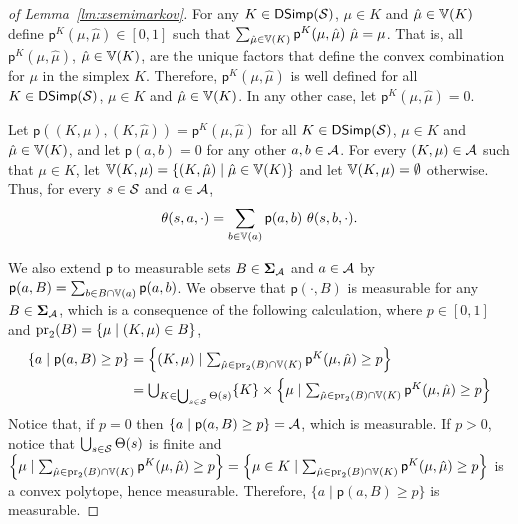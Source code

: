 \begin{proof}[of Lemma~\ref{lm:xsemimarkov}]
  \newcommand{\convp}{\mathsf{p}}%
  For any $K\in\mathsf{DSimp}(\mathcal{S})$, $\mu\in K$ and
  $\hat{\mu}\in\mathbb{V}(K)$ define $\convp^K(\mu,\hat{\mu})\in[0,1]$
  such that
  $\sum_{\hat{\mu}\in\vertices(K)}\convp^K(\mu,\hat{\mu})\mult\hat{\mu}=\mu$.
  That is, all $\convp^K(\mu,\hat{\mu})$, $\hat{\mu}\in\mathbb{V}(K)$,
  are the unique factors that define the convex combination for $\mu$
  in the simplex $K$.  Therefore, $\convp^K(\mu,\hat{\mu})$ is well
  defined for all $K\in\mathsf{DSimp}(\mathcal{S})$, $\mu\in K$ and
  $\hat{\mu}\in\mathbb{V}(K)$.  In any other case, let
  $\convp^K(\mu,\hat{\mu})=0$.

  Let $\convp((K,\mu),(K,\hat{\mu}))=\convp^K(\mu,\hat{\mu})$ for all
  $K\in\mathsf{DSimp}(\mathcal{S})$, $\mu\in K$ and $\hat{\mu}\in\mathbb{V}(K)$,
  and let $\convp(a,b)=0$ for any other $a,b\in\mathcal{A}$.
  For every $(K,\mu)\in\mathcal{A}$ such that $\mu\in K$, let
  $\mathbb{V}(K,\mu)=\{(K,\hat{\mu})\mid\hat{\mu}\in\mathbb{V}(K)\}$ and
  let $\mathbb{V}(K,\mu)=\emptyset$ otherwise.
  Thus, for every $s\in\mathcal{S}$ and $a\in\mathcal{A}$,
  \begin{equation}\label{eq:xsemimarkov:sgtrans:convp}
    \sgtrans(s,a,\cdot) =
    \sum_{b\in\vertices(a)}\convp(a,b)\mult\sgtrans(s,b,\cdot).
  \end{equation}

  We also extend $\convp$ to measurable sets $B\in\bm{\Sigma}_{\mathcal{A}}$
  and $a\in\mathcal{A}$ by
  $\convp(a,B)=\sum_{b\in B\cap\vertices(a)}\convp(a,b)$.
  We observe that $\convp(\cdot,B)$ is measurable for any
  $B\in\bm{\Sigma}_{\mathcal{A}}$, which is a consequence of the following
  calculation, where $p\in[0,1]$ and $\mathrm{pr}_2(B)=\{\mu\mid(K,\mu)\in B\}$,
  \begin{align*}
    \{a\mid\convp(a,B)\geq p\}
    & = \textstyle
    \left\{(K,\mu)\mid\sum_{\hat{\mu}\in\proj_2(B)\cap\vertices(K)}\convp^K(\mu,\hat{\mu})\geq p \right\} \\ 
    & = \textstyle
    \bigcup_{K\in\bigcup_{s\in\psgnodes}\psgtrans(s)}\{K\}\times\left\{\mu\mid\sum_{\hat{\mu}\in\proj_2(B)\cap\vertices(K)}\convp^K(\mu,\hat{\mu})\geq p \right\}  
  \end{align*}
  Notice that, if $p=0$ then $\{a\mid\convp(a,B)\geq p\}=\sgactions$,
  which is measurable. If $p>0$, notice that
  $\bigcup_{s\in\mathcal{S}}\Theta(s)$ is finite and
  $\left\{\mu\mid\sum_{\hat{\mu}\in\proj_2(B)\cap\vertices(K)}\convp^K(\mu,\hat{\mu})\geq p \right\} = \left\{\mu\in K\mid\sum_{\hat{\mu}\in\proj_2(B)\cap\vertices(K)}\convp^K(\mu,\hat{\mu})\geq p \right\}$
  is a convex polytope, hence measurable. Therefore,
  $\{a\mid\convp(a,B)\geq p\}$ is measurable.


\end{proof}

